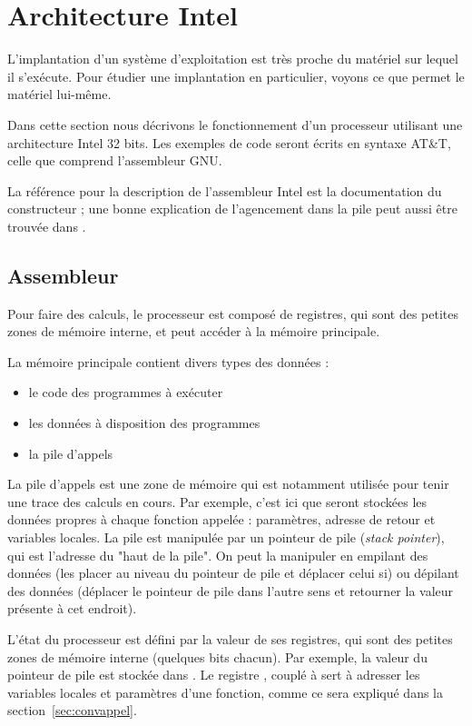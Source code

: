 \section{Architecture Intel}

L'implantation d'un système d'exploitation est très proche du matériel sur
lequel il s'exécute. Pour étudier une implantation en particulier, voyons ce que
permet le matériel lui-même.

Dans cette section nous décrivons le fonctionnement d'un processeur utilisant
une architecture Intel 32 bits. Les exemples de code seront écrits en syntaxe
AT\&T, celle que comprend l'assembleur GNU.

La référence pour la description de l'assembleur Intel est la documentation du
constructeur \cite{intelsys} ; une bonne explication de l'agencement dans la
pile peut aussi être trouvée dans \cite{SmashingTheStack}.

\subsection{Assembleur}

Pour faire des calculs, le processeur est composé de registres, qui sont des
petites zones de mémoire interne, et peut accéder à la mémoire principale.

La mémoire principale contient divers types des données :

\begin{itemize}
\item le code des programmes à exécuter
\item les données à disposition des programmes
\item la pile d'appels
\end{itemize}

La pile d'appels est une zone de mémoire qui est notamment utilisée pour tenir
une trace des calculs en cours. Par exemple, c'est ici que seront stockées les
données propres à chaque fonction appelée : paramètres, adresse de retour et
variables locales. La pile est manipulée par un pointeur de pile (\emph{stack
pointer}), qui est l'adresse du "haut de la pile". On peut la manipuler en
empilant des données (les placer au niveau du pointeur de pile et déplacer celui
si) ou dépilant des données (déplacer le pointeur de pile dans l'autre sens et
retourner la valeur présente à cet endroit).

L'état du processeur est défini par la valeur de ses registres, qui sont des
petites zones de mémoire interne (quelques bits chacun). Par exemple, la valeur
du pointeur de pile est stockée dans \esp. Le registre \ebp, couplé à \esp sert
à adresser les variables locales et paramètres d'une fonction, comme ce sera
expliqué dans la section~\ref{sec:convappel}.

